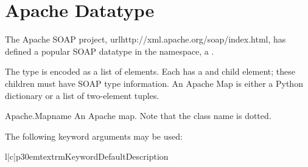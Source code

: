 \section{Apache Datatype}

The Apache SOAP project, url{http://xml.apache.org/soap/index.html},
has defined a popular SOAP datatype in the
 namespace, a
.

The  type is encoded as a list of  elements.
Each  has a  and  child element; these
children must have SOAP type information.
An Apache Map is either a Python dictionary or a list of two-element
tuples.

\begin{classdesc}{Apache.Map}{name}
An Apache map.
Note that the class name is dotted.
\end{classdesc}

The following keyword arguments may be used:

\begin{tableiii}{l|c|p{30em}}{textrm}{Keyword}{Default}{Description}
\end{tableiii}
